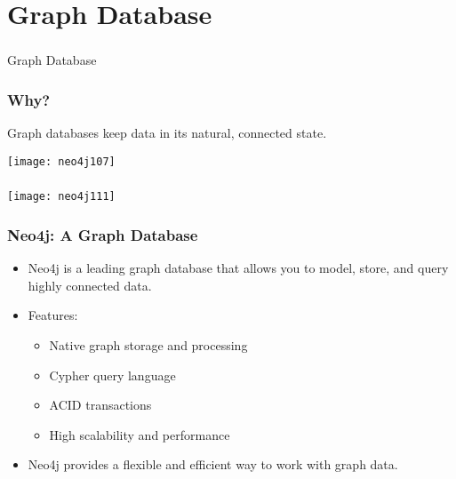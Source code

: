 



\section[Db]{Graph Database}
\begin{frame}[fragile]\frametitle{}
\begin{center}
{\Large Graph Database}
\end{center}
\end{frame}

\begin{frame}[fragile]\frametitle{Why?}

Graph databases keep data in its natural, connected state.

\begin{center}
\texttt{[image: neo4j107]}
\end{center}	  

\end{frame}

\begin{frame}[fragile]\frametitle{}

\begin{center}
\texttt{[image: neo4j111]}
\end{center}	  

\end{frame}

\begin{frame}[fragile]\frametitle{Neo4j: A Graph Database}
  \begin{itemize}
    \item Neo4j is a leading graph database that allows you to model, store, and query highly connected data.
    \item Features:
    \begin{itemize}
      \item Native graph storage and processing
      \item Cypher query language
      \item ACID transactions
      \item High scalability and performance
    \end{itemize}
    \item Neo4j provides a flexible and efficient way to work with graph data.
  \end{itemize}
\end{frame}

